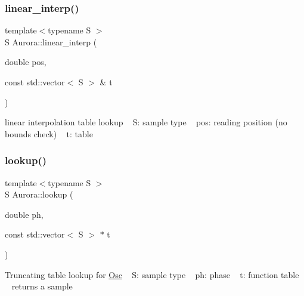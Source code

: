 \mbox{\label{namespace_aurora_acdc5f35b9cbf54f7fc84a423d76bd488}} 
\subsubsection{\texorpdfstring{linear\+\_\+interp()}{linear\_interp()}}
{\footnotesize\ttfamily template$<$typename S $>$ \\
S Aurora\+::linear\+\_\+interp (\begin{DoxyParamCaption}\item[{double}]{pos,  }\item[{const std\+::vector$<$ S $>$ \&}]{t }\end{DoxyParamCaption})\hspace{0.3cm}{\ttfamily [inline]}}

linear interpolation table lookup ~\newline
S\+: sample type ~\newline
pos\+: reading position (no bounds check) ~\newline
t\+: table \mbox{\label{namespace_aurora_ae0082f7bc3946a88145d54bacd0c6ff3}} 
\subsubsection{\texorpdfstring{lookup()}{lookup()}}
{\footnotesize\ttfamily template$<$typename S $>$ \\
S Aurora\+::lookup (\begin{DoxyParamCaption}\item[{double}]{ph,  }\item[{const std\+::vector$<$ S $>$ $\ast$}]{t }\end{DoxyParamCaption})\hspace{0.3cm}{\ttfamily [inline]}}

Truncating table lookup for \hyperlink{class_aurora_1_1_osc}{Osc} ~\newline
S\+: sample type ~\newline
ph\+: phase ~\newline
t\+: function table ~\newline
returns a sample \mbox{\label{namespace_aurora_afab81d7b8873e7850073124fcf37eeea}} 
